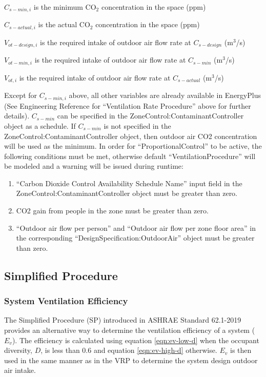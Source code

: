 \({C_{s - min,i}}\) is the minimum CO\(_{2}\) concentration in the space (ppm)

\({C_{s - actual,i}}\) is the actual CO\(_{2}\) concentration in the space (ppm)

\({V_{ot - design,i}}\) is the required intake of outdoor air flow rate at \({C_{s - design}}\) (m\(^{3}\)/s)

\({V_{ot - min,i}}\) is the required intake of outdoor air flow rate at \({C_{s - min}}\) (m\(^{3}\)/s)

\({V_{ot,i}}\) is the required intake of outdoor air flow rate at \({C_{s - actual}}\) (m\(^{3}\)/s)

Except for \({C_{s - min,i}}\) above, all other variables are already available in EnergyPlus (See Engineering Reference for ``Ventilation Rate Procedure'' above for further details). \({C_{s - min}}\) can be specified in the ZoneControl:ContaminantController object as a schedule. If \({C_{s - min}}\) is not specified in the ZoneControl:ContaminantController object, then outdoor air CO2 concentration will be used as the minimum. In order for ``ProportionalControl'' to be active, the following conditions must be met, otherwise default ``VentilationProcedure'' will be modeled and a warning will be issued during runtime:

\begin{enumerate}
\item ``Carbon Dioxide Control Availability Schedule Name'' input field in the ZoneControl:ContaminantController object must be greater than zero.
\item CO2 gain from people in the zone must be greater than zero.
\item ``Outdoor air flow per person'' and ``Outdoor air flow per zone floor area'' in the corresponding ``DesignSpecification:OutdoorAir'' object must be greater than zero.
\end{enumerate}

\subsection{Simplified Procedure}\label{simplified-procedure}

\subsubsection{System Ventilation Efficiency}\label{sp-calculation-of-system-ventilation-efficiency}

The Simplified Procedure (SP) introduced in ASHRAE Standard 62.1-2019 provides an alternative way to determine the ventilation efficiency of a system (\({E_v}\)). The efficiency is calculated using equation \ref{eqn:ev-low-d} when the occupant diversity, \({D}\), is less than 0.6 and equation \ref{eqn:ev-high-d} otherwise. \({E_v}\) is then used in the same manner as in the VRP to determine the system design outdoor air intake.

